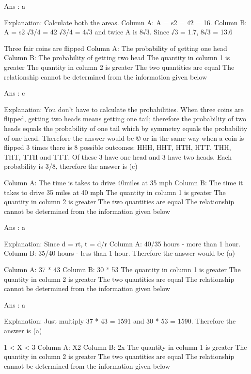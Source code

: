     Ans : a

    Explanation:
    Calculate both the areas.
    Column A: A = s2 = 42 = 16.
    Column B: A = s2 √3/4 = 42 √3/4 = 4√3 and twice A is 8√3. Since √3 = 1.7, 8√3 = 13.6

    Three fair coins are flipped Column A: The probability of getting one head Column B: The probability of getting two head
        The quantity in column 1 is greater
        The quantity in column 2 is greater
        The two quantities are equal
        The relationship cannot be determined from the information given below 

    Ans : c

    Explanation:
    You don't have to calculate the probabilities. When three coins are flipped, getting two heads means getting one tail; therefore the probability of two heads equals the probability of one tail which by symmetry equals the probability of one head. Therefore the answer would be © or in the same way when a coin is flipped 3 times there is 8 possible outcomes: HHH, HHT, HTH, HTT, THH, THT, TTH and TTT. Of these 3 have one head and 3 have two heads. Each probability is 3/8, therefore the answer is (c)

    Column A: The time is takes to drive 40miles at 35 mph
    Column B: The time it takes to drive 35 miles at 40 mph
        The quantity in column 1 is greater
        The quantity in column 2 is greater
        The two quantities are equal
        The relationship cannot be determined from the information given below 

    Ans : a

    Explanation:
    Since d = rt, t = d/r
    Column A: 40/35 hours - more than 1 hour.
    Column B: 35/40 hours - less than 1 hour. Therefore the answer would be (a)

    Column A: 37 * 43
    Column B: 30 * 53
        The quantity in column 1 is greater
        The quantity in column 2 is greater
        The two quantities are equal
        The relationship cannot be determined from the information given below 

    Ans : a

    Explanation:
    Just multiply 37 * 43 = 1591 and 30 * 53 = 1590. Therefore the answer is (a)

    1 < X < 3
    Column A: X2
    Column B: 2x
        The quantity in column 1 is greater
        The quantity in column 2 is greater
        The two quantities are equal
        The relationship cannot be determined from the information given below 

